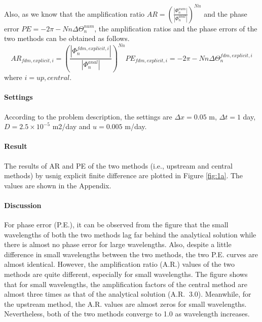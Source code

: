 Also, as we know that the amplification ratio $AR = (\frac{|\Phi_n^{num}|}{|\Phi_n^{anal}|})^{Nn}$ and the phase error $PE = -2\pi-Nn\Delta \Theta_n^{num}$, the amplification ratios and the phase errors of the two methods can be obtained as follows.
\begin{subequations}
  \begin{equation}
    \label{eq:6a}
    AR_{fdm,explicit,i} = (\frac{|\Phi_n^{fdm,explicit,i}|}{|\Phi_n^{anal}|})^{Nn}
  \end{equation}
  \begin{equation}
    \label{eq:6b}
    PE_{fdm,explicit,i} = -2\pi-Nn\Delta \Theta_n^{fdm,explicit,i}
  \end{equation}
\end{subequations}
where $i=up,central$.

\paragraph{Settings}\label{partA-setting} According to the problem description, the settings are $\Delta x=0.05$ m, $\Delta t=1$ day, $D=2.5\times 10^{-5}$ m2/day and $u=0.005$ m/day.

\paragraph{Result} The results of AR and PE of the two methods (i.e., upstream and central methods) by usnig explicit finite difference are plotted in Figure \ref{fig:1a}. The values are shown in the Appendix.

\paragraph{Discussion}\label{partA1-ARPE-discussion} For phase error (P.E.), it can be observed from the figure that the small wavelengths of both the two methods lag far behind the analytical solution while there is almost no phase error for large wavelengths. Also, despite a little difference in small wavelengths between the two methods, the two P.E. curves are almost identical. However, the amplification ratio (A.R.) values of the two methods are quite different, especially for small wavelengths. The figure shows that for small wavelengths, the amplification factors of the central method are almost three times as that of the analytical solution (A.R.$~$ 3.0). Meanwhile, for the upstream method, the A.R. values are almost zeros for small wavelengths. Nevertheless, both of the two methods converge to 1.0 as wavelength increases.

